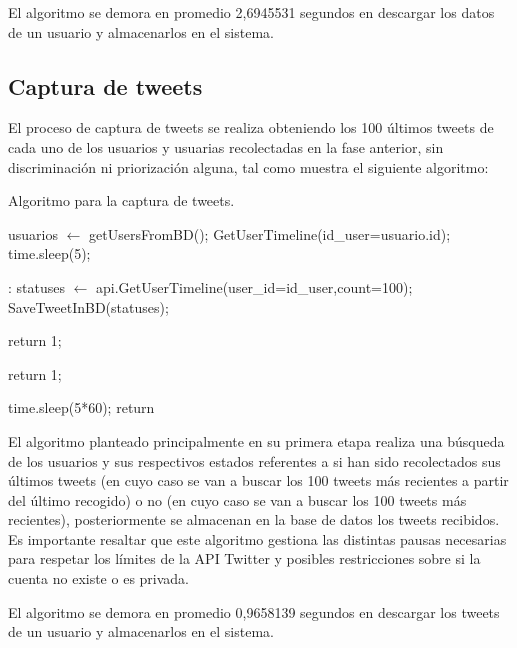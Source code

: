 

El algoritmo se demora en promedio 2,6945531 segundos en descargar los datos de un usuario y almacenarlos en el sistema.

\subsection{Captura de tweets}

El proceso de captura de tweets se realiza obteniendo los 100 últimos tweets de cada uno de los usuarios y usuarias recolectadas en la fase anterior, sin discriminación ni priorización alguna, tal como muestra el siguiente algoritmo:

\begin{algorithm}[H]
	\caption{Algoritmo para la captura de tweets.}\label{getTweets}
	\begin{algorithmic}[1]
		\State usuarios $\gets$ getUsersFromBD();
		\State GetUserTimeline(id\_user=usuario.id);
		\EndFor
		\State time.sleep(5);
		\EndFunction
		
		:
		\State statuses $\gets$ api.GetUserTimeline(user\_id=id\_user,count=100);
		\State SaveTweetInBD(statuses);
		
		\State return 1;
		\EndIf
		
		\State return 1;
		\EndIf
		
		\State time.sleep(5*60);
		\State return
		\EndIf
		\EndFunction
	\end{algorithmic}
\end{algorithm}

El algoritmo planteado principalmente en su primera etapa realiza una búsqueda de los usuarios y sus respectivos estados referentes a si han sido recolectados sus últimos tweets (en cuyo caso se van a buscar los 100 tweets más recientes a partir del último recogido) o no (en cuyo caso se van a buscar los 100 tweets más recientes), posteriormente se almacenan en la base de datos los tweets recibidos. Es importante resaltar que este algoritmo gestiona las distintas pausas necesarias para respetar los límites de la API Twitter y posibles restricciones sobre si la cuenta no existe o es privada. 

El algoritmo se demora en promedio 0,9658139 segundos en descargar los tweets de un usuario y almacenarlos en el sistema.

